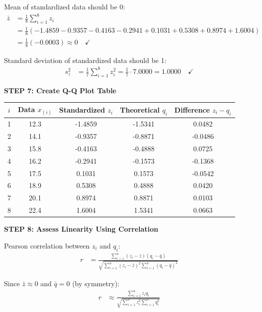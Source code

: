 \documentclass[12pt]{article}
\begin{document}
\begin{solution}
Mean of standardized data should be 0:
\begin{align*}
\bar{z} &= \frac{1}{8}\sum_{i=1}^{8} z_i \\
&= \frac{1}{8}(-1.4859 - 0.9357 - 0.4163 - 0.2941 + 0.1031 + 0.5308 + 0.8974 + 1.6004) \\
&= \frac{1}{8}(-0.0003) \approx 0 \quad \checkmark
\end{align*}

Standard deviation of standardized data should be 1:
\begin{align*}
s_z^2 &= \frac{1}{7}\sum_{i=1}^{8} z_i^2 = \frac{1}{7} \cdot 7.0000 = 1.0000 \quad \checkmark
\end{align*}

\textbf{STEP 7: Create Q-Q Plot Table}

\begin{center}
\begin{tabular}{ccccc}
\hline
$i$ & Data $x_{(i)}$ & Standardized $z_i$ & Theoretical $q_i$ & Difference $z_i - q_i$ \\
\hline
1 & 12.3 & -1.4859 & -1.5341 & 0.0482 \\
2 & 14.1 & -0.9357 & -0.8871 & -0.0486 \\
3 & 15.8 & -0.4163 & -0.4888 & 0.0725 \\
4 & 16.2 & -0.2941 & -0.1573 & -0.1368 \\
5 & 17.5 & 0.1031 & 0.1573 & -0.0542 \\
6 & 18.9 & 0.5308 & 0.4888 & 0.0420 \\
7 & 20.1 & 0.8974 & 0.8871 & 0.0103 \\
8 & 22.4 & 1.6004 & 1.5341 & 0.0663 \\
\hline
\end{tabular}
\end{center}

\textbf{STEP 8: Assess Linearity Using Correlation}

Pearson correlation between $z_i$ and $q_i$:
\begin{align*}
r &= \frac{\sum_{i=1}^{n} (z_i - \bar{z})(q_i - \bar{q})}{\sqrt{\sum_{i=1}^{n}(z_i - \bar{z})^2 \sum_{i=1}^{n}(q_i - \bar{q})^2}}
\end{align*}

Since $\bar{z} \approx 0$ and $\bar{q} = 0$ (by symmetry):
\begin{align*}
r &\approx \frac{\sum_{i=1}^{n} z_i q_i}{\sqrt{\sum_{i=1}^{n} z_i^2 \sum_{i=1}^{n} q_i^2}}
\end{align*}


\end{solution}
\end{document}
